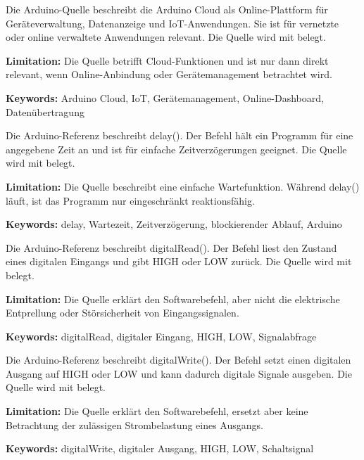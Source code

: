 
{ 
	Die Arduino-Quelle beschreibt die Arduino Cloud als Online-Plattform für Geräteverwaltung, Datenanzeige und IoT-Anwendungen. Sie ist für vernetzte oder online verwaltete Anwendungen relevant. Die Quelle wird mit \cite{arduinoCloud:2025} belegt.
	
	\bigskip
	
	\textbf{Limitation:} Die Quelle betrifft Cloud-Funktionen und ist nur dann direkt relevant, wenn Online-Anbindung oder Gerätemanagement betrachtet wird.
	
	\scriptsize{\textbf{Keywords:} Arduino Cloud, IoT, Gerätemanagement, Online-Dashboard, Datenübertragung}
}



{ 
	Die Arduino-Referenz beschreibt delay(). Der Befehl hält ein Programm für eine angegebene Zeit an und ist für einfache Zeitverzögerungen geeignet. Die Quelle wird mit \cite{arduino_delay} belegt.
	
	\bigskip
	
	\textbf{Limitation:} Die Quelle beschreibt eine einfache Wartefunktion. Während delay() läuft, ist das Programm nur eingeschränkt reaktionsfähig.
	
	\scriptsize{\textbf{Keywords:} delay, Wartezeit, Zeitverzögerung, blockierender Ablauf, Arduino}
}



{ 
	Die Arduino-Referenz beschreibt digitalRead(). Der Befehl liest den Zustand eines digitalen Eingangs und gibt HIGH oder LOW zurück. Die Quelle wird mit \cite{arduino_digitalread} belegt.
	
	\bigskip
	
	\textbf{Limitation:} Die Quelle erklärt den Softwarebefehl, aber nicht die elektrische Entprellung oder Störsicherheit von Eingangssignalen.
	
	\scriptsize{\textbf{Keywords:} digitalRead, digitaler Eingang, HIGH, LOW, Signalabfrage}
}



{ 
	Die Arduino-Referenz beschreibt digitalWrite(). Der Befehl setzt einen digitalen Ausgang auf HIGH oder LOW und kann dadurch digitale Signale ausgeben. Die Quelle wird mit \cite{arduino_digitalwrite} belegt.
	
	\bigskip
	
	\textbf{Limitation:} Die Quelle erklärt den Softwarebefehl, ersetzt aber keine Betrachtung der zulässigen Strombelastung eines Ausgangs.
	
	\scriptsize{\textbf{Keywords:} digitalWrite, digitaler Ausgang, HIGH, LOW, Schaltsignal}
}


